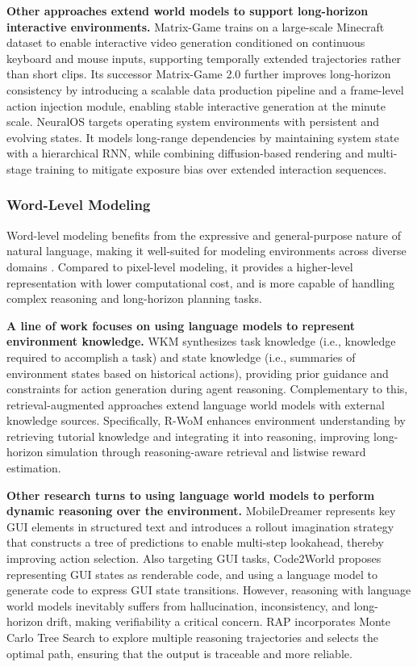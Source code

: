\textbf{Other approaches extend world models to support long-horizon interactive environments.} 
Matrix-Game \cite{Matrix-Game} trains on a large-scale Minecraft dataset to enable interactive video generation conditioned on continuous keyboard and mouse inputs, supporting temporally extended trajectories rather than short clips. Its successor Matrix-Game 2.0 \cite{Matrix-Game_2.0} further improves long-horizon consistency by introducing a scalable data production pipeline and a frame-level action injection module, enabling stable interactive generation at the minute scale. 
NeuralOS \cite{NeuralOS} targets operating system environments with persistent and evolving states. It models long-range dependencies by maintaining system state with a hierarchical RNN, while combining diffusion-based rendering and multi-stage training to mitigate exposure bias over extended interaction sequences.


\subsubsection{Word-Level Modeling}
\label{sec:Word-level Modeling}

Word-level modeling benefits from the expressive and general-purpose nature of natural language, making it well-suited for modeling environments across diverse domains \cite{GTM, CWM, ITP}. Compared to pixel-level modeling, it provides a higher-level representation with lower computational cost, and is more capable of handling complex reasoning and long-horizon planning tasks.

\textbf{A line of work focuses on using language models to represent environment knowledge.} WKM \cite{WKM} synthesizes task knowledge (i.e., knowledge required to accomplish a task) and state knowledge (i.e., summaries of environment states based on historical actions), providing prior guidance and constraints for action generation during agent reasoning. Complementary to this, retrieval-augmented approaches extend language world models with external knowledge sources. Specifically, R-WoM \cite{R-WoM} enhances environment understanding by retrieving tutorial knowledge and integrating it into reasoning, improving long-horizon simulation through reasoning-aware retrieval and listwise reward estimation. 

\textbf{Other research turns to using language world models to perform dynamic reasoning over the environment.} MobileDreamer \cite{MobileDreamer} represents key GUI elements in structured text and introduces a rollout imagination strategy that constructs a tree of predictions to enable multi-step lookahead, thereby improving action selection. Also targeting GUI tasks, Code2World \cite{Code2World} proposes representing GUI states as renderable code, and using a language model to generate code to express GUI state transitions. However, reasoning with language world models inevitably suffers from hallucination, inconsistency, and long-horizon drift, making verifiability a critical concern. RAP \cite{RAP} incorporates Monte Carlo Tree Search to explore multiple reasoning trajectories and selects the optimal path, ensuring that the output is traceable and more reliable.


